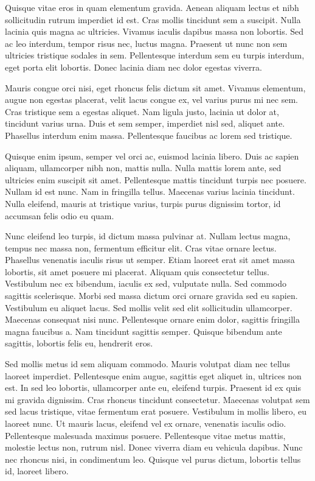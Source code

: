 \documentclass[11pt]{article}
\begin{document}
Quisque vitae eros in quam elementum gravida. Aenean aliquam lectus et
nibh sollicitudin rutrum imperdiet id est. Cras mollis tincidunt sem a
suscipit. Nulla lacinia quis magna ac ultricies. Vivamus iaculis dapibus
massa non lobortis. Sed ac leo interdum, tempor risus nec, luctus magna.
Praesent ut nunc non sem ultricies tristique sodales in sem.
Pellentesque interdum sem eu turpis interdum, eget porta elit lobortis.
Donec lacinia diam nec dolor egestas viverra.

Mauris congue orci nisi, eget rhoncus felis dictum sit amet. Vivamus
elementum, augue non egestas placerat, velit lacus congue ex, vel varius
purus mi nec sem. Cras tristique sem a egestas aliquet. Nam ligula
justo, lacinia ut dolor at, tincidunt varius urna. Duis et sem semper,
imperdiet nisl sed, aliquet ante. Phasellus interdum enim massa.
Pellentesque faucibus ac lorem sed tristique.

Quisque enim ipsum, semper vel orci ac, euismod lacinia libero. Duis ac
sapien aliquam, ullamcorper nibh non, mattis nulla. Nulla mattis lorem
ante, sed ultricies enim suscipit sit amet. Pellentesque mattis
tincidunt turpis nec posuere. Nullam id est nunc. Nam in fringilla
tellus. Maecenas varius lacinia tincidunt. Nulla eleifend, mauris at
tristique varius, turpis purus dignissim tortor, id accumsan felis odio
eu quam.

Nunc eleifend leo turpis, id dictum massa pulvinar at. Nullam lectus
magna, tempus nec massa non, fermentum efficitur elit. Cras vitae ornare
lectus. Phasellus venenatis iaculis risus ut semper. Etiam laoreet erat
sit amet massa lobortis, sit amet posuere mi placerat. Aliquam quis
consectetur tellus. Vestibulum nec ex bibendum, iaculis ex sed,
vulputate nulla. Sed commodo sagittis scelerisque. Morbi sed massa
dictum orci ornare gravida sed eu sapien. Vestibulum eu aliquet lacus.
Sed mollis velit sed elit sollicitudin ullamcorper. Maecenas consequat
nisi nunc. Pellentesque ornare enim dolor, sagittis fringilla magna
faucibus a. Nam tincidunt sagittis semper. Quisque bibendum ante
sagittis, lobortis felis eu, hendrerit eros.

Sed mollis metus id sem aliquam commodo. Mauris volutpat diam nec tellus
laoreet imperdiet. Pellentesque enim augue, sagittis eget aliquet in,
ultrices non est. In sed leo lobortis, ullamcorper ante eu, eleifend
turpis. Praesent id ex quis mi gravida dignissim. Cras rhoncus tincidunt
consectetur. Maecenas volutpat sem sed lacus tristique, vitae fermentum
erat posuere. Vestibulum in mollis libero, eu laoreet nunc. Ut mauris
lacus, eleifend vel ex ornare, venenatis iaculis odio. Pellentesque
malesuada maximus posuere. Pellentesque vitae metus mattis, molestie
lectus non, rutrum nisl. Donec viverra diam eu vehicula dapibus. Nunc
nec rhoncus nisi, in condimentum leo. Quisque vel purus dictum, lobortis
tellus id, laoreet libero.
\end{document}
